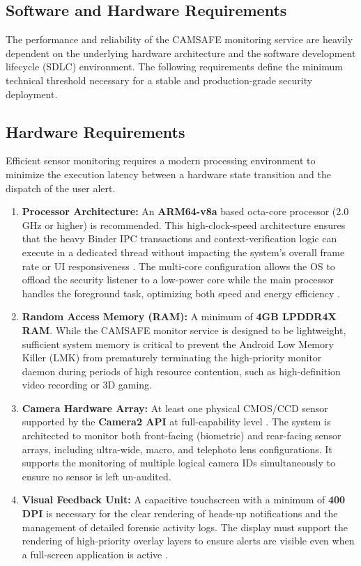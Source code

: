 \documentclass[12pt,a4paper]{report}
\begin{document}
\begin{enumerate}
    \section{Software and Hardware Requirements}
    The performance and reliability of the CAMSAFE monitoring service are heavily dependent on the underlying hardware architecture and the software development lifecycle (SDLC) environment. The following requirements define the minimum technical threshold necessary for a stable and production-grade security deployment.

    \subsection{Hardware Requirements}
    Efficient sensor monitoring requires a modern processing environment to minimize the execution latency between a hardware state transition and the dispatch of the user alert.
    \begin{enumerate}
        \item \textbf{Processor Architecture:} An \textbf{ARM64-v8a} based octa-core processor (2.0 GHz or higher) is recommended. This high-clock-speed architecture ensures that the heavy Binder IPC transactions and context-verification logic can execute in a dedicated thread without impacting the system's overall frame rate or UI responsiveness \cite{androidhal}. The multi-core configuration allows the OS to offload the security listener to a low-power core while the main processor handles the foreground task, optimizing both speed and energy efficiency \cite{edgecomp}.
        \item \textbf{Random Access Memory (RAM):} A minimum of \textbf{4GB LPDDR4X RAM}. While the CAMSAFE monitor service is designed to be lightweight, sufficient system memory is critical to prevent the Android Low Memory Killer (LMK) from prematurely terminating the high-priority monitor daemon during periods of high resource contention, such as high-definition video recording or 3D gaming.
       \item \textbf{Camera Hardware Array:} At least one physical CMOS/CCD sensor supported by the \textbf{Camera2 API} at full-capability level \cite{androidhal}. The system is architected to monitor both front-facing (biometric) and rear-facing sensor arrays, including ultra-wide, macro, and telephoto lens configurations. It supports the monitoring of multiple logical camera IDs simultaneously to ensure no sensor is left un-audited.


        \newpage
        \item \textbf{Visual Feedback Unit:} A capacitive touchscreen with a minimum of \textbf{400 DPI} is necessary for the clear rendering of heads-up notifications and the management of detailed forensic activity logs. The display must support the rendering of high-priority overlay layers to ensure alerts are visible even when a full-screen application is active \cite{privacydot}.
    \end{enumerate}



\end{enumerate}
\end{document}
